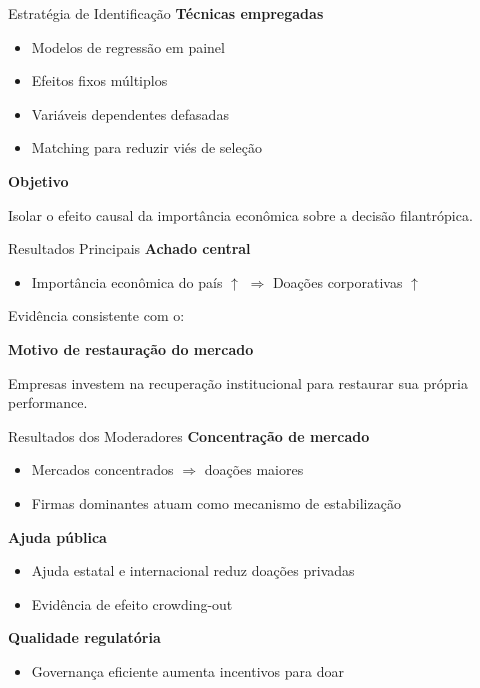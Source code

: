 \documentclass[
  10pt,
  ignorenonframetext,
  aspectratio=169,
  brazilian,
]{beamer}
\providecommand{\tightlist}{%
  \setlength{\itemsep}{0pt}\setlength{\parskip}{0pt}}
\begin{document}
\begin{frame}{Estratégia de Identificação}
\label{estratuxe9gia-de-identificauxe7uxe3o}
\textbf{Técnicas empregadas}

\begin{itemize}
\tightlist
\item
  Modelos de regressão em painel
\item
  Efeitos fixos múltiplos
\item
  Variáveis dependentes defasadas
\item
  Matching para reduzir viés de seleção
\end{itemize}

\textbf{Objetivo}

Isolar o efeito causal da importância econômica sobre a decisão
filantrópica.
\end{frame}

\begin{frame}{Resultados Principais}
\label{resultados-principais}
\textbf{Achado central}

\begin{itemize}
\tightlist
\item
  Importância econômica do país \(\uparrow\) \(\Rightarrow\) Doações
  corporativas \(\uparrow\)
\end{itemize}

Evidência consistente com o:

\textbf{Motivo de restauração do mercado}

Empresas investem na recuperação institucional para restaurar sua
própria performance.
\end{frame}

\begin{frame}{Resultados dos Moderadores}
\label{resultados-dos-moderadores}
\textbf{Concentração de mercado}

\begin{itemize}
\tightlist
\item
  Mercados concentrados \(\Rightarrow\) doações maiores
\item
  Firmas dominantes atuam como mecanismo de estabilização
\end{itemize}

\textbf{Ajuda pública}

\begin{itemize}
\tightlist
\item
  Ajuda estatal e internacional reduz doações privadas
\item
  Evidência de efeito crowding-out
\end{itemize}

\textbf{Qualidade regulatória}

\begin{itemize}
\tightlist
\item
  Governança eficiente aumenta incentivos para doar
\end{itemize}
\end{frame}
\end{document}
